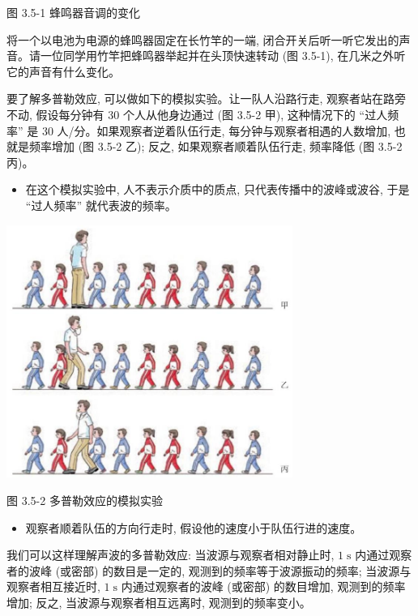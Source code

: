 \documentclass[10pt]{article}
\begin{document}
图 3.5-1 蜂鸣器音调的变化

将一个以电池为电源的蜂鸣器固定在长竹竿的一端, 闭合开关后听一听它发出的声音。请一位同学用竹竿把蜂鸣器举起并在头顶快速转动 (图 3.5-1), 在几米之外听它的声音有什么变化。

要了解多普勒效应, 可以做如下的模拟实验。让一队人沿路行走, 观察者站在路旁不动, 假设每分钟有 30 个人从他身边通过 (图 3.5-2 甲), 这种情况下的 “过人频率” 是 30 人/分。如果观察者逆着队伍行走, 每分钟与观察者相遇的人数增加, 也就是频率增加 (图 3.5-2 乙); 反之, 如果观察者顺着队伍行走, 频率降低 (图 3.5-2 丙)。

\begin{itemize}
\item 在这个模拟实验中, 人不表示介质中的质点, 只代表传播中的波峰或波谷, 于是 “过人频率” 就代表波的频率。
\end{itemize}

\begin{center}
\includegraphics[max width=0.7\textwidth]{images/01910e4c-ebb8-7d2c-8f2f-2375bc1d2d12_85_791242.jpg}
\end{center}

图 3.5-2 多普勒效应的模拟实验

\begin{itemize}
\item 观察者顺着队伍的方向行走时, 假设他的速度小于队伍行进的速度。
\end{itemize}

我们可以这样理解声波的多普勒效应: 当波源与观察者相对静止时, \(1\mathrm{\;s}\) 内通过观察者的波峰 (或密部) 的数目是一定的, 观测到的频率等于波源振动的频率; 当波源与观察者相互接近时, \(1\mathrm{\;s}\) 内通过观察者的波峰 (或密部) 的数目增加, 观测到的频率增加; 反之, 当波源与观察者相互远离时, 观测到的频率变小。
\end{document}
